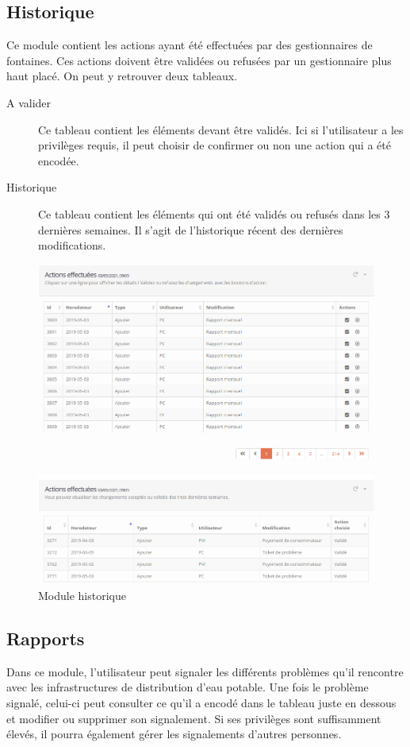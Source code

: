 \documentclass{EPL-master-thesis-covers-FR}
\begin{document}
			\subsection{Historique}
			\label{sec:historique}
				Ce module contient les actions ayant été effectuées par des gestionnaires de fontaines. Ces actions doivent être validées ou refusées par un gestionnaire plus haut placé. On peut y retrouver deux tableaux.
				\begin{description}
					\item[A valider] Ce tableau contient les éléments devant être validés. Ici si l'utilisateur a les privilèges requis, il peut choisir de confirmer ou non une action qui a été encodée.
					\item[Historique] Ce tableau contient les éléments qui ont été validés ou refusés dans les 3 dernières semaines. Il s'agit de l'historique récent des dernières modifications.
				\end{description}
				\begin{figure}[H]
					\centering
					\includegraphics[width=1\textwidth]{images/logs}
					\caption{Module historique}
				\end{figure}
			
			\subsection{Rapports}
				Dans ce module, l'utilisateur peut signaler les différents problèmes qu'il rencontre avec les infrastructures de distribution d'eau potable. Une fois le problème signalé, celui-ci peut consulter ce qu'il a encodé dans le tableau juste en dessous et modifier ou supprimer son signalement. Si ses privilèges sont suffisamment élevés, il pourra également gérer les signalements d'autres personnes.
				
\end{document}
